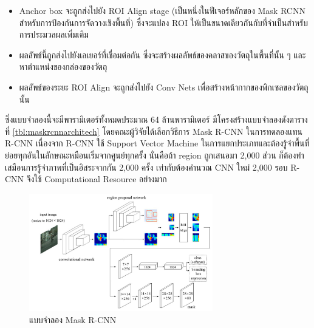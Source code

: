 \documentclass[12pt,oneside,openright,a4paper]{cpe-thai-project}
\begin{document}
\begin{itemize}
\begin{itemize}
        \item Anchor box จะถูกส่งไปยัง ROI Align stage (เป็นหนึ่งในฟีเจอร์หลักของ Mask RCNN สำหรับการป้องกันการจัดวางเชิงพื้นที่) ซึ่งจะแปลง ROI ให้เป็นขนาดเดียวกันกับที่จำเป็นสำหรับการประมวลผลเพิ่มเติม
        \item ผลลัพธ์นี้ถูกส่งไปยังเลเยอร์ที่เชื่อมต่อกัน ซึ่งจะสร้างผลลัพธ์ของคลาสของวัตถุในพื้นที่นั้น ๆ และหาตำแหน่งของกล่องของวัตถุ
        \item ผลลัพธ์ของระยะ ROI Align จะถูกส่งไปยัง Conv Nets เพื่อสร้างหน้ากากของพิกเซลของวัตถุนั้น
    \end{itemize}
ซึ่งแบบจำลองนี้จะมีพารามิเตอร์ทั้งหมดประมาณ 64 ล้านพารามิเตอร์ \cite{model_maskpara} มีโครงสร้างแบบจำลองดังตารางที่ \ref{tbl:maskrcnnarchitech} 
โดยคณะผู้วิจัยได้เลือกวิธีการ Mask R-CNN ในการทดลองแทน R-CNN เนื่องจาก R-CNN ใช้ Support Vector Machine ในการแยกประเภทและต้องรู้จำพื้นที่ย่อยทุกอันในลักษณะหมือนเริ่มจากศูนย์ทุกครั้ง นั่นคือถ้า region ถูกเสนอมา 2,000 ส่วน ก็ต้องทำเสมือนการรู้จำภาพที่เป็นอิสระจากกัน 2,000 ครั้ง เท่ากับต้องคำนวณ CNN ใหม่ 2,000 รอบ R-CNN จึงใช้ Computational Resource อย่างมาก \cite{markrcnn}

\begin{figure}[!h]
    \centering
    \includegraphics[width=8cm]{images/sensors-20-01010-g003.png}
    \caption[แบบจำลอง Mask R-CNN]{แบบจำลอง Mask R-CNN \cite{img_maskrcnn}}
    \label{fig:mrcnn}
\end{figure}


\end{itemize}
\end{document}
